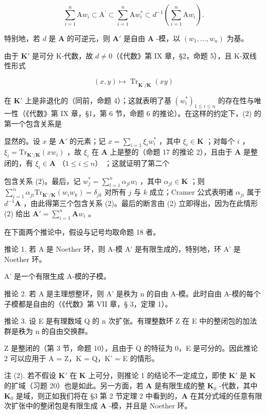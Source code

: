 \[
\sum_ {i = 1} ^ {n} \mathrm{A} w _ {i} \subset \mathrm{A} ^ {\prime} \subset \sum_ {i = 1} ^ {n} \mathrm{A} w _ {i} ^ {*} \subset d ^ {- 1} \left(\sum_ {i = 1} ^ {n} \mathrm{A} w _ {i}\right).\tag{2}
\]

特别地，若 \(d\) 是 \(\mathbf{A}\) 的可逆元，则 \(\mathbf{A}'\) 是自由 \(\mathbf{A}\) -模，以 \((w_1, \ldots, w_n)\) 为基。

由于 \(\mathbf{K}'\) 是可分 K-代数，故 \(d \neq 0\)（《代数》第 IX 章，§2，命题 5），且 K-双线性形式

\[
(x, y) \mapsto \operatorname{Tr} _ {\mathbf {K} ^ {\prime} / \mathbf {K}} (x y)
\]

在 \(\mathbf{K}'\) 上是非退化的（同前，命题 4）；这就表明了基 \((w_{i}^{*})_{1\leqslant i\leqslant n}\) 的存在性与唯一性（《代数》第 IX 章，§1，第 6 节，命题 6 的推论）。在这样的约定下，(2) 的第一个包含关系是

显然的。设 \(x\) 是 \(\mathbf{A}'\) 的元素；记 \(x = \sum_{i=1} \xi_i w_i^*\) ，其中 \(\xi_i \in \mathbf{K}\) ；对每个 \(i\) ，\(\xi_i = \mathrm{Tr}_{\mathbf{K}' / \mathbf{K}}(xw_i)\) ，故 \(\xi_i\) 在 \(\mathbf{A}\) 上是整的（命题 17 的推论 2），且由于 \(\mathbf{A}\) 是整闭的，有 \(\xi_i \in \mathbf{A}\) （\(1 \leqslant i \leqslant n\)） ；这就证明了第二个

包含关系 (2)。最后，记 \(w_{j}^{*} = \sum_{l=1}^{n} \alpha_{jl} w_{l}\) ，其中 \(\alpha_{jl} \in \mathbf{K}\) ；则 \(\sum_{i=1}^{n} \alpha_{ji} \mathrm{Tr}_{\mathbf{K}'/\mathbf{K}}(w_i w_k) = \delta_{jk}\) 对所有 \(j\) 与 \(k\) 成立；Cramer 公式表明诸 \(\alpha_{ji}\) 属于 \(d^{-1}\mathbf{A}\) ，由此得第三个包含关系 (2)。最后的断言由 (2) 立即得出，因为在此情形 (2) 给出 \(\mathbf{A}' = \sum_{i=1}^{n} \mathbf{A}w_i\) 。

在下面两个推论中，假设与记号均取命题 18 者。

推论 1. 若 A 是 Noether 环，则 A-模 A' 是有限生成的，特别地，环 A' 是 Noether 环。

A' 是一个有限生成 A-模的子模。

推论 2. 若 A 是主理想整环，则 A' 是秩为 n 的自由 A-模。此时自由 A-模的每个子模都是自由的（《代数》第 VII 章，§ 3，定理 1）。

推论 3. 设 E 是有理数域 Q 的 n 次扩张。有理整数环 Z 在 E 中的整闭包的加法群是秩为 n 的自由交换群。

Z 是整闭的（第 3 节，命题 10），且由于 Q 的特征为 0，E 是可分的。因此推论 2 可以应用于 A = Z，K = Q，K' = E 的情形。

注 (2). 若不假设 \(\mathbf{K}'\) 在 \(\mathbf{K}\) 上可分，则推论 1 的结论不一定成立，即使 \(\mathbf{K}'\) 是 \(\mathbf{K}\) 的扩域（习题 20）也是如此。另一方面，若 \(\mathbf{A}\) 是有限生成的整 \(\mathbf{K}_0\) -代数，其中 \(\mathbf{K}_0\) 是域，则正如我们将在 §3 第 2 节定理 2 中看到的，\(\mathbf{A}\) 在其分式域的任意有限次扩张中的整闭包是有限生成 \(\mathbf{A}\) -模，并且是 Noether 环。

